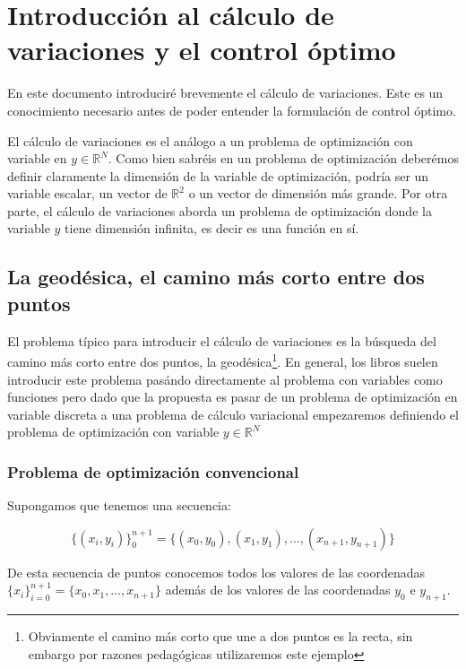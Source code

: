 \chapter{Introducción al cálculo de variaciones y el control óptimo}
En este documento introduciré brevemente el cálculo de variaciones. Este es un conocimiento necesario antes de poder entender la formulación de control óptimo.

El cálculo de variaciones es el análogo a un problema de optimización con variable en $ y\in \mathbb{R}^N $. Como bien sabréis en un problema de optimización deberémos definir claramente la dimensión de la variable de optimización, podría ser un variable escalar, un vector de $\mathbb{R}^2$ o un vector de dimensión más grande. Por otra parte, el cálculo de variaciones aborda un problema de optimización donde la variable $y$ tiene dimensión infinita, es decir es una función en sí. 

\section{La geodésica, el camino más corto entre dos puntos }

El problema típico para introducir el cálculo de variaciones es la búsqueda del camino más corto entre dos puntos, la geodésica\footnote{Obviamente el camino más corto que une a dos puntos es la recta, sin embargo por razones pedagógicas utilizaremos este ejemplo}. En general, los libros  suelen introducir este problema pasándo directamente al problema con variables como funciones pero dado que la propuesta es pasar de un problema de optimización en variable discreta a una problema de cálculo variacional empezaremos definiendo el problema de optimización con variable $y \in \mathbb{R}^N$


\subsection{Problema de optimización convencional}

Supongamos que tenemos una secuencia:

\begin{equation}
        \{(x_i,y_i) \}_{0}^{n+1} = \{ (x_0,y_0),(x_1,y_1),\dots,(x_{n+1},y_{n+1})\}
\end{equation}
 
De esta secuencia de puntos conocemos todos los valores de las coordenadas $\{ x_i \}_{i=0}^{n+1} = \{x_0,x_1,\dots,x_{n+1}\}$ además de los valores de las coordenadas  $y_0$ e $y_{n+1}$. 

